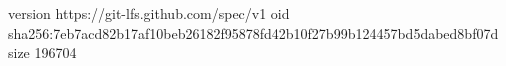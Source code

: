 version https://git-lfs.github.com/spec/v1
oid sha256:7eb7acd82b17af10beb26182f95878fd42b10f27b99b124457bd5dabed8bf07d
size 196704
